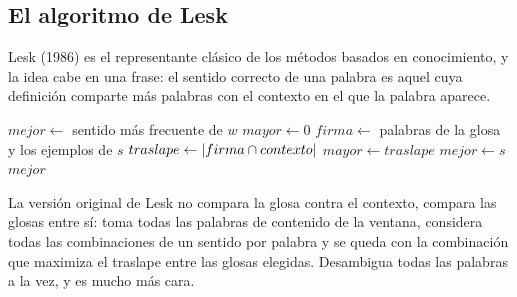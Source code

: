 \documentclass[11pt,letterpaper]{article}
\begin{document}
\subsection*{El algoritmo de Lesk}

Lesk (1986) es el representante clásico de los métodos basados en
conocimiento, y la idea cabe en una frase: el sentido correcto de una
palabra es aquel cuya definición comparte más palabras con el
contexto en el que la palabra aparece.

\begin{algorithm}[H]
\caption{Lesk simplificado}
\begin{algorithmic}[1]
    \State $mejor \gets$ sentido más frecuente de $w$
    \State $mayor \gets 0$
        \State $firma \gets$ palabras de la glosa y los ejemplos
                            de $s$
        \State $traslape \gets \left\lvert firma \cap contexto \right\rvert$
            \State $mayor \gets traslape$
            \State $mejor \gets s$
        \EndIf
    \EndFor
    \State \Return $mejor$
\EndProcedure
\end{algorithmic}
\end{algorithm}

La versión original de Lesk no compara la glosa contra el contexto,
compara las glosas entre sí: toma todas las palabras de contenido de
la ventana, considera todas las combinaciones de un sentido por
palabra y se queda con la combinación que maximiza el traslape entre
las glosas elegidas. Desambigua todas las palabras a la vez, y es
mucho más cara.
\end{document}
